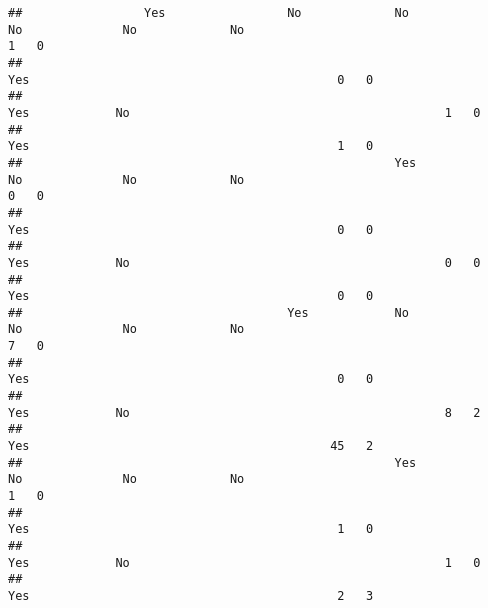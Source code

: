 \documentclass[
]{article}
\begin{document}
\begin{verbatim}
##                 Yes                 No             No                     No              No             No                                            1   0
##                                                                                                          Yes                                           0   0
##                                                                                           Yes            No                                            1   0
##                                                                                                          Yes                                           1   0
##                                                    Yes                    No              No             No                                            0   0
##                                                                                                          Yes                                           0   0
##                                                                                           Yes            No                                            0   0
##                                                                                                          Yes                                           0   0
##                                     Yes            No                     No              No             No                                            7   0
##                                                                                                          Yes                                           0   0
##                                                                                           Yes            No                                            8   2
##                                                                                                          Yes                                          45   2
##                                                    Yes                    No              No             No                                            1   0
##                                                                                                          Yes                                           1   0
##                                                                                           Yes            No                                            1   0
##                                                                                                          Yes                                           2   3
\end{verbatim}
\end{document}

